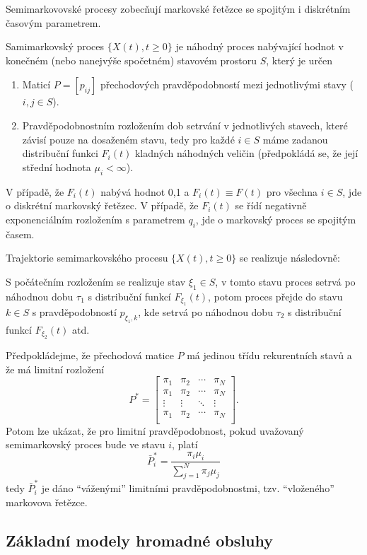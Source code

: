 \documentclass[10pt]{article}
\begin{document}
Semimarkovovské procesy zobecňují markovské řetězce se spojitým i diskrétním časovým parametrem.

Samimarkovský proces $\{X(t),t \geq 0\}$ je náhodný proces nabývající hodnot v konečném (nebo nanejvýše spočetném) stavovém prostoru $S$, který je určen
\begin{enumerate}
\item Maticí $P=[p_{ij}]$ přechodových pravděpodobností mezi jednotlivými stavy ($i,j \in S$).
\item Pravděpodobnostním rozložením dob setrvání v jednotlivých stavech, které závisí pouze na dosaženém stavu, tedy pro každé $i \in S$ máme zadanou distribuční funkci $F_i(t)$ kladných náhodných veličin (předpokládá se, že její střední hodnota $\mu_i < \infty$).
\end{enumerate}

V případě, že $F_i(t)$ nabývá hodnot 0,1 a $F_i(t) \equiv F(t)$ pro všechna $i \in S$, jde o diskrétní markovský řetězec. V případě, že $F_i(t)$ se řídí negativně exponenciálním rozložením s parametrem $q_i$, jde o markovský proces se spojitým časem.

Trajektorie semimarkovského procesu $\{X(t), t \geq 0\}$ se realizuje následovně:

S počátečním rozložením se realizuje stav $\xi_1 \in S$, v tomto stavu proces setrvá po náhodnou dobu $\tau_1$ s distribuční funkcí $F_{\xi_1}(t)$, potom proces přejde do stavu $k \in S$ s pravděpodobností $p_{\xi_1,k}$, kde setrvá po náhodnou dobu $\tau_2$ s distribuční funkcí $F_{\xi_2}(t)$ atd.

Předpokládejme, že přechodová matice $P$ má jedinou třídu rekurentních stavů a že má limitní rozložení 
$$
P^* = 
\begin{bmatrix}
\pi_1 & \pi_2 & \cdots & \pi_N \\ 
\pi_1 & \pi_2 & \cdots & \pi_N \\ 
\vdots & \vdots & \ddots & \vdots\\
\pi_1 & \pi_2 & \cdots & \pi_N \\ 
\end{bmatrix}.
$$Potom lze ukázat, že pro limitní pravděpodobnost, pokud uvažovaný semimarkovský proces bude ve stavu $i$, platí $$\bar{P}^*_i = \frac{\pi_i \mu_i}{\sum_{j=1}^N \pi_j \mu_j}$$ tedy $\bar{P}^*_i$ je dáno ``váženými'' limitními pravděpodobnostmi, tzv. ``vloženého'' markovova řetězce.

\subsection{Základní modely hromadné obsluhy}
\end{document}
